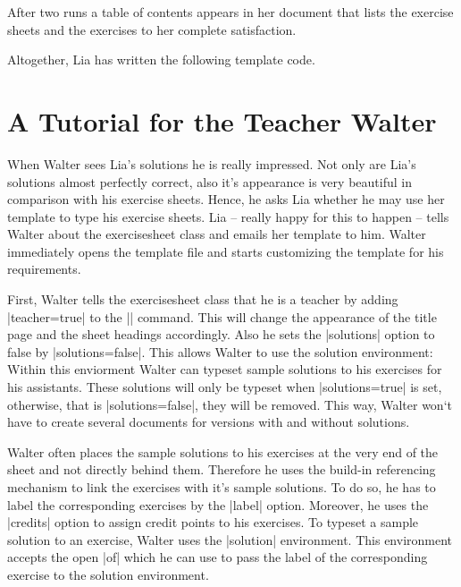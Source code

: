 \documentclass[a4paper,fleqn]{report}
\def\exercisesheet{{exercisesheet}}
\begin{document}


\noindent After two runs a table of contents appears in her document
that lists the exercise sheets and the exercises to her complete
satisfaction. 

\noindent Altogether, Lia has written the following template code.




\section{A Tutorial for the Teacher Walter}

When Walter sees Lia's solutions he is really impressed. Not only are
Lia's solutions almost perfectly correct, also it's appearance is very
beautiful in comparison with his exercise sheets. Hence, he asks Lia
whether he may use her template to type his exercise sheets. Lia --
really happy for this to happen -- tells Walter about the
\exercisesheet{} class and emails her template to him. Walter
immediately opens the template file and starts customizing the
template for his requirements.

First, Walter tells the \exercisesheet{} class that he is a teacher by
adding |teacher=true| to the |\sheetconf| command. This will change
the appearance of the title page and the sheet headings accordingly.
Also he sets the |solutions| option to false by |solutions=false|.
This allows Walter to use the solution environment: Within this
enviorment Walter can typeset sample solutions to his exercises for
his assistants. These solutions will only be typeset when
|solutions=true| is set, otherwise, that is |solutions=false|, they
will be removed. This way, Walter won‘t have to create several
documents for versions with and without solutions.



\noindent Walter often places the sample solutions to his exercises at
the very end of the sheet and not directly behind them. Therefore he
uses the build-in referencing mechanism to link the exercises with
it's sample solutions. To do so, he has to label the corresponding
exercises by the |label| option. Moreover, he uses the |credits|
option to assign credit points to his exercises. To typeset a sample
solution to an exercise, Walter uses the |solution| environment. This
environment accepts the open |of| which he can use to pass the label
of the corresponding exercise to the solution environment.
\end{document}
